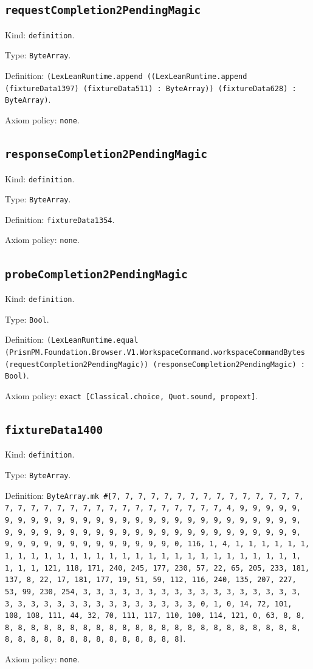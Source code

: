 \documentclass[11pt]{article}
\begin{document}
\subsection*{\texttt{requestCompletion2PendingMagic}}
\noindent Kind: \texttt{definition}.\par
\noindent Type: \texttt{ByteArray}.\par
\noindent Definition: \texttt{(LexLeanRuntime.append ((LexLeanRuntime.append (fixtureData1397) (fixtureData511) : ByteArray)) (fixtureData628) : ByteArray)}.\par
\noindent Axiom policy: \texttt{none}.\par
\subsection*{\texttt{responseCompletion2PendingMagic}}
\noindent Kind: \texttt{definition}.\par
\noindent Type: \texttt{ByteArray}.\par
\noindent Definition: \texttt{fixtureData1354}.\par
\noindent Axiom policy: \texttt{none}.\par
\subsection*{\texttt{probeCompletion2PendingMagic}}
\noindent Kind: \texttt{definition}.\par
\noindent Type: \texttt{Bool}.\par
\noindent Definition: \texttt{(LexLeanRuntime.equal (PrismPM.Foundation.Browser.V1.WorkspaceCommand.workspaceCommandBytes (requestCompletion2PendingMagic)) (responseCompletion2PendingMagic) : Bool)}.\par
\noindent Axiom policy: \texttt{exact [Classical.choice, Quot.sound, propext]}.\par
\subsection*{\texttt{fixtureData1400}}
\noindent Kind: \texttt{definition}.\par
\noindent Type: \texttt{ByteArray}.\par
\noindent Definition: \texttt{ByteArray.mk \#[7, 7, 7, 7, 7, 7, 7, 7, 7, 7, 7, 7, 7, 7, 7, 7, 7, 7, 7, 7, 7, 7, 7, 7, 7, 7, 7, 7, 7, 7, 7, 7, 4, 9, 9, 9, 9, 9, 9, 9, 9, 9, 9, 9, 9, 9, 9, 9, 9, 9, 9, 9, 9, 9, 9, 9, 9, 9, 9, 9, 9, 9, 9, 9, 9, 9, 9, 9, 9, 9, 9, 9, 9, 9, 9, 9, 9, 9, 9, 9, 9, 9, 9, 9, 9, 9, 9, 9, 9, 9, 9, 9, 9, 9, 9, 9, 9, 0, 116, 1, 4, 1, 1, 1, 1, 1, 1, 1, 1, 1, 1, 1, 1, 1, 1, 1, 1, 1, 1, 1, 1, 1, 1, 1, 1, 1, 1, 1, 1, 1, 1, 1, 1, 121, 118, 171, 240, 245, 177, 230, 57, 22, 65, 205, 233, 181, 137, 8, 22, 17, 181, 177, 19, 51, 59, 112, 116, 240, 135, 207, 227, 53, 99, 230, 254, 3, 3, 3, 3, 3, 3, 3, 3, 3, 3, 3, 3, 3, 3, 3, 3, 3, 3, 3, 3, 3, 3, 3, 3, 3, 3, 3, 3, 3, 3, 3, 3, 0, 1, 0, 14, 72, 101, 108, 108, 111, 44, 32, 70, 111, 117, 110, 100, 114, 121, 0, 63, 8, 8, 8, 8, 8, 8, 8, 8, 8, 8, 8, 8, 8, 8, 8, 8, 8, 8, 8, 8, 8, 8, 8, 8, 8, 8, 8, 8, 8, 8, 8, 8, 8, 8, 8, 8, 8, 8, 8]}.\par
\noindent Axiom policy: \texttt{none}.\par
\end{document}
